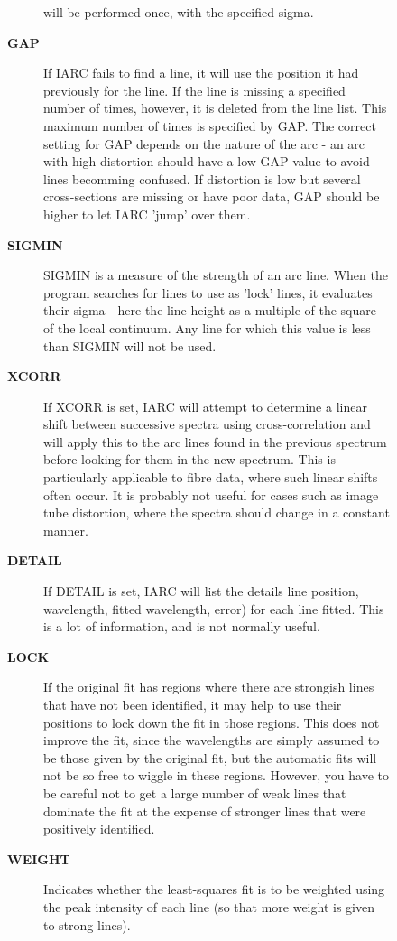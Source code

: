\begin{description}
\begin{description}
\begin{description}
 will be performed once, with the specified sigma.
\item [\textbf{GAP}]
 If IARC fails to find a line, it will use the position
 it had previously for the line.  If the line is missing
 a specified number of times, however, it is deleted from
 the line list.  This maximum number of times is specified
 by GAP.  The correct setting for GAP depends on the nature
 of the arc - an arc with high distortion should have a low
 GAP value to avoid lines becomming confused.  If distortion
 is low but several cross-sections are missing or have poor
 data, GAP should be higher to let IARC 'jump' over them.
\item [\textbf{SIGMIN}]
 SIGMIN is a measure of the strength of an arc line.  When
 the program searches for lines to use as 'lock' lines, it
 evaluates their sigma - here the line height as a multiple
 of the square of the local continuum.  Any line for which
 this value is less than SIGMIN will not be used.
\item [\textbf{XCORR}]
 If XCORR is set, IARC will attempt to determine a linear
 shift between successive spectra using cross-correlation
 and will apply this to the arc lines found in the previous
 spectrum before looking for them in the new spectrum. This
 is particularly applicable to fibre data, where such linear
 shifts often occur.  It is probably not useful for cases
 such as image tube distortion, where the spectra should
 change in a constant manner.
\item [\textbf{DETAIL}]
 If DETAIL is set, IARC will list the details line position,
 wavelength, fitted wavelength, error) for each line fitted.
 This is a lot of information, and is not normally useful.
\item [\textbf{LOCK}]
 If the original fit has regions where there are strongish
 lines that have not been identified, it may help to use
 their positions to lock down the fit in those regions.  This
 does not improve the fit, since the wavelengths are simply
 assumed to be those given by the original fit, but the
 automatic fits will not be so free to wiggle in these regions.
 However, you have to be careful not to get a large number of
 weak lines that dominate the fit at the expense of stronger
 lines that were positively identified.
\item [\textbf{WEIGHT}]
 Indicates whether the least-squares fit is to be weighted using
 the peak intensity of each line (so that more weight is given to
 strong lines).
\end{description}


\end{description}
\end{description}
